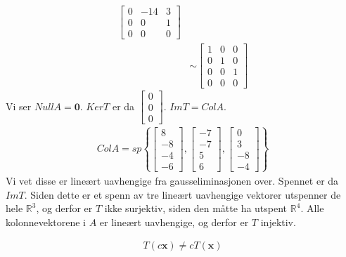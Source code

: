 \documentclass[11pt, a4paper, norsk]{NTNUoving}
\begin{document}
\begin{oppgave}[1]
\begin{punkt}
\begin{align}
\begin{bmatrix}
                0 & -14 & 3\\
                0 & 0 & 1\\
                0 & 0 & 0
            \end{bmatrix}
            \\&\sim
            \begin{bmatrix}
                1 & 0 & 0 \\
                0 & 1 & 0\\
                0 & 0 & 1\\
                0 & 0 & 0
            \end{bmatrix}
        \end{align}
        Vi ser $NullA=\textbf{0}$. $KerT$ er da $\begin{bmatrix}0\\0\\0\end{bmatrix}$.
        $ImT=ColA$.
        \begin{align*}ColA=sp\left\{
            \begin{bmatrix}
                8 \\-8\\-4\\-6\end{bmatrix},
            \begin{bmatrix}
                -7\\-7\\5\\6\end{bmatrix},
            \begin{bmatrix}
                0\\3\\-8\\-4
            \end{bmatrix}
            \right\}
        \end{align*}
        Vi vet disse er lineært uavhengige fra gausseliminasjonen over. Spennet er da $ImT$. Siden dette er et spenn av tre lineært uavhengige vektorer utspenner de hele $\mathbb{R}^3$, og derfor er $T$ ikke surjektiv, siden den måtte ha utspent $\mathbb{R}^4$. Alle kolonnevektorene i $A$ er lineært uavhengige, og derfor er $T$ injektiv. 
    \end{punkt}
    \begin{punkt}
        \begin{align*}
            T(c\textbf{x})\neq cT(\textbf{x})
        \end{align*}
    \end{punkt}

\end{oppgave}
\end{document}
